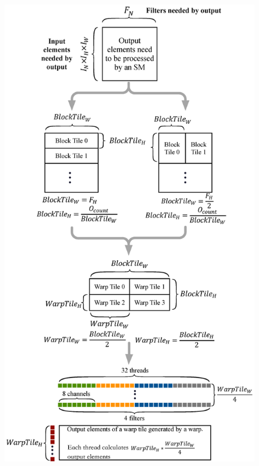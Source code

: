 \begin{figure}
	\centering
    \includegraphics[width=\columnwidth]{./figure/pwflow.eps}
    \caption{} \label{fig:pwflow}
\end{figure}

